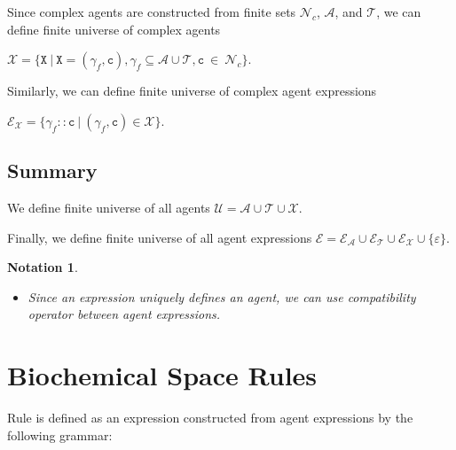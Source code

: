\documentclass{entcs}
\renewcommand{\~}[0]{\texttildelow}
\newtheorem{notation}[thm]{Notation}
\begin{document}
\begin{theorem}
Since complex agents are constructed from finite sets $\mathcal{N}_{c}$, $\mathcal{A}$, and $\mathcal{T}$, we can define finite universe of complex agents 

$\mathcal{X} = \{ \mathtt{X}~|~\mathtt{X} = (\gamma_f, \mathtt{c}), \gamma_f \subseteq \mathcal{A} \cup \mathcal{T},  \mathtt{c}~\in~\mathcal{N}_{c} \}$.

\noindent Similarly, we can define finite universe of complex agent expressions

 $\mathcal{E}_\mathcal{X} = \{ \gamma_f::\mathtt{c} ~|~ (\gamma_f, \mathtt{c}) \in \mathcal{X} \}$.
\end{theorem}

\subsection{Summary}

\begin{defn}
We define finite universe of all agents $\mathcal{U} = \mathcal{A} \cup \mathcal{T} \cup \mathcal{X}.$

\noindent Finally, we define finite universe of all agent expressions $\mathcal{E} = \mathcal{E}_\mathcal{A} \cup \mathcal{E}_\mathcal{T} \cup \mathcal{E}_\mathcal{X} \cup \{\varepsilon\}$.
\end{defn}

\begin{notation}
~
\begin{itemize}
\item Since an expression uniquely defines an agent, we can use compatibility operator between agent expressions.
\end{itemize}
\end{notation}

\section{Biochemical Space Rules}


Rule is defined as an expression constructed from agent expressions by the following grammar:
\end{document}
